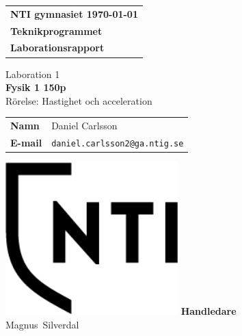 \documentclass[11p, titlepage, oneside, a4paper]{article}
\makeatletter
\def\inst{Teknikprogrammet}
\def\typeofdoc{Laborationsrapport}
\def\course{Fysik 1 150p}
\def\pretitle{Laboration 1}
\def\title{Rörelse: Hastighet och acceleration}
\def\name{Daniel Carlsson}
\def\username{daniel.carlsson2}
\def\email{\username{}@ga.ntig.se}
\def\graders{Magnus Silverdal}
\makeatother
\begin{document}
\begin{titlepage}
		\thispagestyle{empty}		\begin{large}
			\begin{tabular}{@{}p{\textwidth}@{}}
				\textbf{NTI gymnasiet \hfill \today} \\
				\textbf{\inst} \\
				\textbf{\typeofdoc} \\
			\end{tabular}
		\end{large}
		\vspace{10mm}
		\begin{center}
			\LARGE{\pretitle} \\
			\huge{\textbf{\course}}\\
			\vspace{10mm}
			\LARGE{\title} \\
			\vspace{15mm}
			\begin{large}
				\begin{tabular}{ll}
					\textbf{Namn} & \name \\
					\textbf{E-mail} & \texttt{\email} \\
				\end{tabular}
			\end{large}
			\vfill
            \includegraphics[width=0.5\textwidth]{images/NTI Gymnasiet_Symbol_print_svart.png}
			\vfill
            \large{\textbf{Handledare}}\\
			\mbox{\large{\graders}}
		\end{center}
	\end{titlepage}
\end{document}
